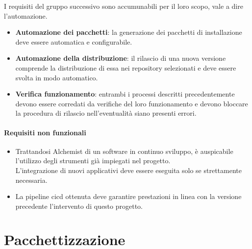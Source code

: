 I requisiti del gruppo successivo sono accumunabili per il loro scopo, vale a dire l'automazione.

\begin{itemize}
	\item \textbf{Automazione dei pacchetti}: la generazione dei pacchetti di installazione deve essere automatica e configurabile.
	\item \textbf{Automazione della distribuzione}: il rilascio di una nuova versione comprende la distribuzione di essa nei repository selezionati e deve essere svolta in modo automatico.
	\item \textbf{Verifica funzionamento}: entrambi i processi descritti precedentemente devono essere corredati da verifiche del loro funzionamento e devono bloccare la procedura di rilascio nell'eventualità siano presenti errori.
\end{itemize}

\paragraph{Requisiti non funzionali}

\begin{itemize}
	\item Trattandosi Alchemist di un software in continuo sviluppo, è auspicabile l'utilizzo degli strumenti già impiegati nel progetto. \\ L'integrazione di nuovi applicativi deve essere eseguita solo se strettamente necessaria.
	\item La pipeline \ac{cicd} ottenuta deve garantire prestazioni in linea con la versione precedente l'intervento di questo progetto.
\end{itemize}

\section{Pacchettizzazione}\label{sec:packaging}

